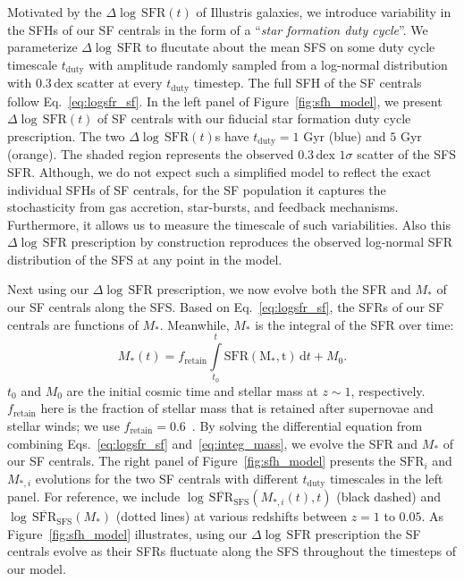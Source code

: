\documentclass[12pt, letterpaper, preprint]{aastex}
\newcommand{\beq}{\begin{equation}}
\newcommand{\eeq}{\end{equation}}
\newcommand{\logsfr}{\log \, \mathrm{SFR}}
\newcommand{\musfms}{\log\,\overline{\mathrm{SFR}}_\mathrm{SFS}}
\begin{document}
Motivated by the $\Delta \logsfr(t)$ of Illustris galaxies, we introduce 
variability in the SFHs of our SF centrals in the form of a ``\emph{star 
formation duty cycle}''. We parameterize $\Delta \logsfr$ to flucutate about 
the mean SFS on some duty cycle timescale $t_\mathrm{duty}$ with amplitude
randomly sampled from a log-normal distribution with $0.3\,\mathrm{dex}$ 
scatter at every $t_\mathrm{duty}$ timestep. The full SFH of the SF 
centrals follow Eq.~\ref{eq:logsfr_sf}.
In the left panel of Figure~\ref{fig:sfh_model}, we 
present $\Delta \logsfr(t)$ of SF centrals with our fiducial star formation 
duty cycle prescription. The two $\Delta \logsfr(t)$s have $t_\mathrm{duty}=1$ 
Gyr (blue) and $5$ Gyr (orange). The shaded region represents the observed 
$0.3\,\mathrm{dex}$ $1\sigma$ scatter of the SFS SFR. 
Although, we do not expect such a simplified model to reflect the exact 
individual SFHs of SF centrals, for the SF population it captures the 
stochasticity from gas accretion, star-bursts, and feedback mechanisms.
Furthermore, it allows us to measure the timescale of such variabilities. 
Also this $\Delta \logsfr$ prescription by construction reproduces the 
observed log-normal SFR distribution of the SFS at any point in the model. 

Next using our $\Delta \logsfr$ prescription, we now evolve both the 
SFR and $M_*$ of our SF centrals along the SFS. Based on Eq.~\ref{eq:logsfr_sf},
the SFRs of our SF centrals are functions of $M_*$. Meanwhile, $M_*$ 
is the integral of the SFR over time: 
\beq \label{eq:integ_mass} 
M_*(t) = f_\mathrm{retain} \int\limits_{t_0}^{t} \mathrm{SFR(M_*, t)}\,\mathrm{d}t + M_0. 
\eeq
$t_0$ and $M_0$ are the initial cosmic time and stellar mass at $z \sim 1$, 
respectively. $f_\mathrm{retain}$ here is the fraction of stellar mass 
that is retained after supernovae and stellar winds; we use $f_\mathrm{retain} = 0.6$~\citep{wetzel2013}. 
By solving the differential equation from combining Eqs.~\ref{eq:logsfr_sf} 
and~\ref{eq:integ_mass}, we evolve the SFR and $M_*$ of our SF centrals.  
The right panel of Figure~\ref{fig:sfh_model} presents the $\mathrm{SFR}_i$ 
and $M_{*,i}$ evolutions for the two SF centrals with different 
$t_\mathrm{duty}$ timescales in the left panel. For reference, we include 
$\musfms(M_{*,i}(t), t)$ (black dashed) and $\musfms(M_*)$ 
(dotted lines) at various redshifts between $z = 1$ to $0.05$. As 
Figure~\ref{fig:sfh_model} illustrates, using our $\Delta \logsfr$ 
prescription the SF centrals evolve as their SFRs fluctuate along the SFS 
throughout the timesteps of our model. 
\end{document}

